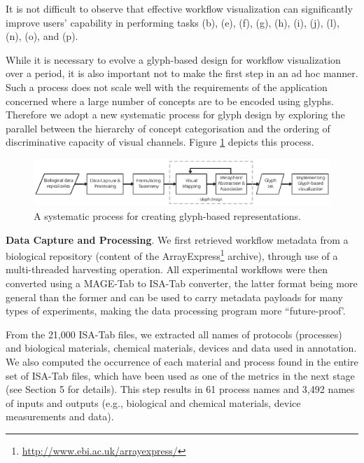 It is not difficult to observe that effective workflow visualization can significantly improve users' capability in performing tasks (b), (e), (f), (g), (h), (i), (j), (l), (n), (o), and (p).

While it is necessary to evolve a glyph-based design for workflow visualization over a period, it is also important not to make the first step in an ad hoc manner. Such a process does not scale well with the requirements of the application concerned where a large number of concepts are to be encoded using glyphs. Therefore we adopt a new systematic process for glyph design by exploring the parallel between the hierarchy of concept categorisation and the ordering of discriminative capacity of visual channels.
Figure \ref{fig:workflow} depicts this process.

\begin{figure}[t!]
\centering
\includegraphics[width=\textwidth]{images/glyph-taxonomy/workflow.eps}
\caption{A systematic process for creating glyph-based representations.}
\label{fig:workflow}
\vspace{-10pt}
\end{figure}

\textbf{Data Capture and Processing}. We first retrieved workflow metadata from a biological repository (content of the ArrayExpress\footnote{\url{http://www.ebi.ac.uk/arrayexpress/}} archive), through use of a multi-threaded harvesting operation.
All experimental workflows were then converted using a MAGE-Tab \cite{rayner2006simple} to ISA-Tab \cite{rocca-serra10,sansone12} converter, the latter format being more general than the former and can be used to carry metadata payloads for many types of experiments, making the data processing program more ``future-proof'.

From the 21,000 ISA-Tab files, we extracted all names of protocols (processes) and biological materials, chemical materials, devices and data used in annotation. We also computed the occurrence of each material and process found in the entire set of ISA-Tab files, which have been used as one of the metrics in the next stage (see Section 5 for details). This step results in 61 process names and 3,492 names of inputs and outputs (e.g., biological and chemical materials, device measurements and data).

